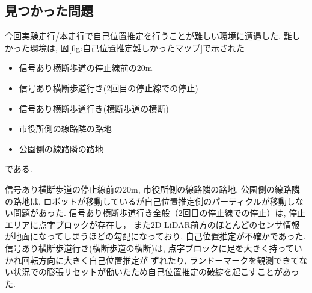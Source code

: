 \documentclass[twocolumn,9pt]{jsproceedings}
\begin{document}
\subsection{見つかった問題}

今回実験走行/本走行で自己位置推定を行うことが難しい環境に遭遇した. 
難しかった環境は, 図\ref{fig:自己位置推定難しかったマップ}で示された
\begin{itemize}
  \item 信号あり横断歩道の停止線前の20m
  \item 信号あり横断歩道行き(2回目の停止線での停止)
  \item 信号あり横断歩道行き(横断歩道の横断)
  \item 市役所側の線路隣の路地
  \item 公園側の線路隣の路地
\end{itemize}
である. 

信号あり横断歩道の停止線前の20m, 市役所側の線路隣の路地, 公園側の線路隣の路地は, 
ロボットが移動しているが自己位置推定側のパーティクルが移動しない問題があった. 
信号あり横断歩道行き全般（2回目の停止線での停止）は, 停止エリアに点字ブロックが存在し，
また2D LiDAR前方のほとんどのセンサ情報が地面になってしまうほどの勾配になっており, 自己位置推定が不確かであった.
信号あり横断歩道行き(横断歩道の横断)は, 点字ブロックに足を大きく持っていかれ回転方向に大きく自己位置推定が
ずれたり, ランドーマークを観測できてない状況での膨張リセットが働いたため自己位置推定の破綻を起こすことがあった. 







\end{document}
